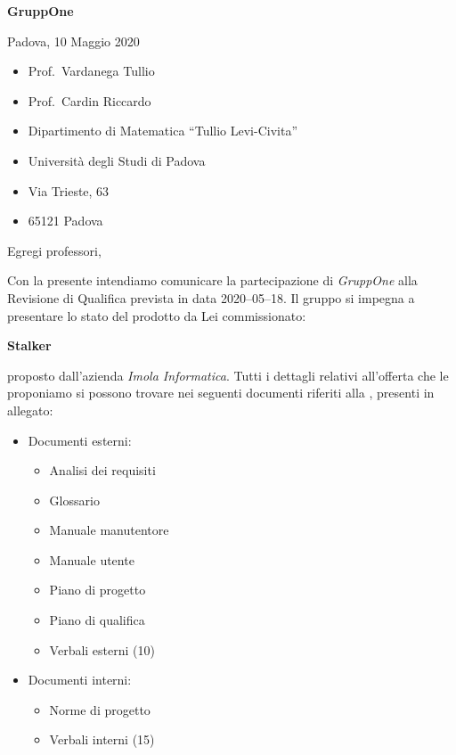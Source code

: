 \documentclass{article}
\begin{document}
\begin{center}
  {\LARGE \textbf{GruppOne}}
\end{center}

\begin{multicols}{2}
  Padova, 10 Maggio 2020
  \columnbreak{}
  \begin{itemize}
    \setlength{\itemsep}{0mm}
    \setlength{\parskip}{0mm}
    \renewcommand{\labelitemi}{}
    \item Prof.\ Vardanega Tullio
    \item Prof.\ Cardin Riccardo
    \item Dipartimento di Matematica ``Tullio Levi-Civita''
    \item Università degli Studi di Padova
    \item Via Trieste, 63
    \item 65121 Padova
  \end{itemize}
\end{multicols}
Egregi professori,

Con la presente intendiamo comunicare la partecipazione di \textit{GruppOne} alla Revisione di Qualifica prevista in data 2020--05--18.
Il gruppo si impegna a presentare lo stato del prodotto da Lei commissionato:
\begin{center}
  \textbf{Stalker}
\end{center}
proposto dall'azienda \textit{Imola Informatica}.
Tutti i dettagli relativi all'offerta che le proponiamo si possono trovare nei seguenti documenti riferiti alla \versione, presenti in allegato:

\begin{itemize}
  \item Documenti esterni:
        \begin{itemize}
          \item Analisi dei requisiti
          \item Glossario
          \item Manuale manutentore
          \item Manuale utente
          \item Piano di progetto
          \item Piano di qualifica
          \item Verbali esterni (10)
        \end{itemize}
  \item Documenti interni:
        \begin{itemize}
          \item Norme di progetto
          \item Verbali interni (15)
        \end{itemize}
\end{itemize}
\end{document}
